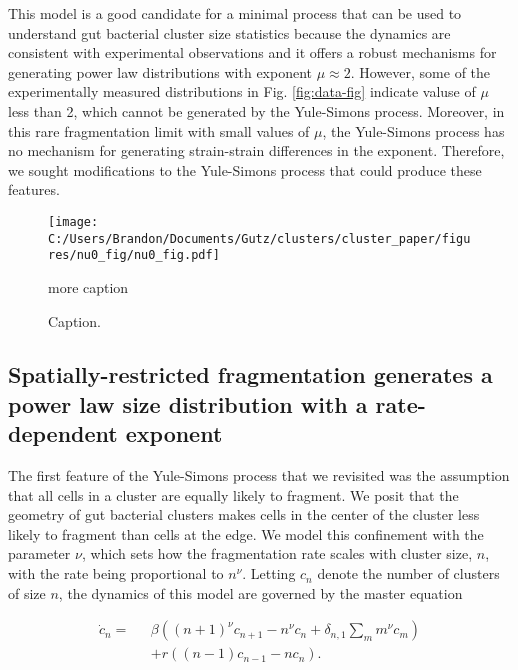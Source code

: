 \documentclass[aps,pre,twocolumn]{revtex4-1}
\begin{document}
This model is a good candidate for a minimal process that can be used to understand gut bacterial cluster size statistics because the dynamics are consistent with experimental observations and it offers a robust mechanisms for generating power law distributions with exponent $\mu \approx 2$. However, some of the experimentally measured distributions in Fig. \ref{fig:data-fig} indicate valuse of $\mu$ less than 2, which cannot be generated by the Yule-Simons process. Moreover, in this rare fragmentation limit with small values of $\mu$, the Yule-Simons process has no mechanism for generating strain-strain differences in the exponent. Therefore, we sought modifications to the Yule-Simons process that could produce these features.


 
  \begin{figure}%
 	\centerline{
 		\texttt{[image: C:/Users/Brandon/Documents/Gutz/clusters/cluster\_paper/figures/nu0\_fig/nu0\_fig.pdf]}}
 	\caption{Caption.}{more caption}
 	\label{fig:nu0-fig}
 \end{figure}
 




\subsection{Spatially-restricted fragmentation generates a power law size distribution with a rate-dependent exponent}
The first feature of the Yule-Simons process that we revisited was the assumption that all cells in a cluster are equally likely to fragment. We posit that the geometry of gut bacterial clusters makes cells in the center of the cluster less likely to fragment than cells at the edge. We model this confinement with the parameter $\nu$, which sets how the fragmentation rate scales with cluster size, $n$, with the rate being proportional to $n^{\nu}$. Letting $c_n$ denote the number of clusters of size $n$, the dynamics of this model are governed by the master equation 



	\begin{align}
	\dot{c}_n = \text{ }&\beta\left((n+1)^{\nu}c_{n+1}- n^{\nu}c_n + \delta_{n,1}\sum_m m^{\nu}c_m\right)\nonumber\\[6pt]
	&+r\left((n-1)c_{n-1} - nc_n\right). 
	\end{align}
\end{document}
